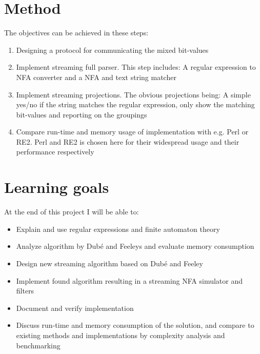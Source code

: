 \documentclass[10pt, a4paper]{article}
\begin{document}
\section*{Method}
The objectives can be achieved in these steps:
\begin{enumerate}
\item Designing a protocol for communicating the mixed bit-values %
\item Implement streaming full parser. This step includes: A regular
  expression to NFA converter and a NFA and text string matcher
\item Implement streaming projections. The obvious projections being:
  A simple yes/no if the string matches the regular expression, only
  show the matching bit-values and reporting on the groupings
\item Compare run-time and memory usage of implementation with
  e.g. Perl or RE2. Perl and RE2 is chosen here for their widespread
  usage and their performance respectively
\end{enumerate}

\section*{Learning goals}
At the end of this project I will be able to:

\begin{itemize}
\item Explain and use regular expressions and finite automaton theory
\item Analyze algorithm by Dub\'{e} and Feeleys and evaluate memory
  consumption
\item Design new streaming algorithm based on Dub\'{e} and Feeley
\item Implement found algorithm resulting in a streaming NFA
  simulator and filters
\item Document and verify implementation
\item Discuss run-time and memory consumption of the solution, and
  compare to existing methods and implementations by complexity
  analysis and benchmarking
\end{itemize}



\end{document}
